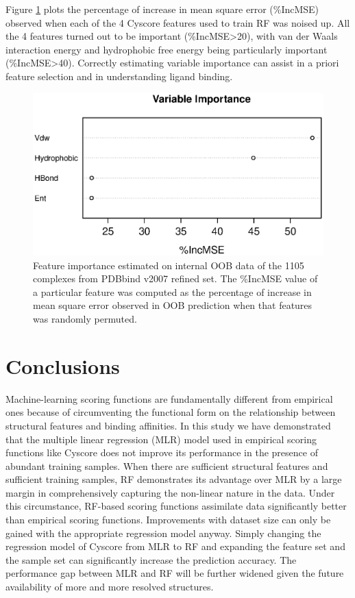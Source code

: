\documentclass[journal=jacsat,manuscript=article]{achemso}
\begin{document}
Figure \ref{fig:varimp} plots the percentage of increase in mean square error (\%IncMSE) observed when each of the 4 Cyscore features used to train RF was noised up. All the 4 features turned out to be important (\%IncMSE\textgreater 20), with van der Waals interaction energy and hydrophobic free energy being particularly important (\%IncMSE\textgreater 40). Correctly estimating variable importance can assist in a priori feature selection and in understanding ligand binding.

\begin{figure}
\includegraphics[width=\linewidth]{../rfcyscore/x4/rf/trn-1105.eps}
\caption{Feature importance estimated on internal OOB data of the 1105 complexes from PDBbind v2007 refined set. The \%IncMSE value of a particular feature was computed as the percentage of increase in mean square error observed in OOB prediction when that features was randomly permuted.}
\label{fig:varimp}
\end{figure}

\section{Conclusions}

Machine-learning scoring functions are fundamentally different from empirical ones because of circumventing the functional form on the relationship between structural features and binding affinities. In this study we have demonstrated that the multiple linear regression (MLR) model used in empirical scoring functions like Cyscore does not improve its performance in the presence of abundant training samples. When there are sufficient structural features and sufficient training samples, RF demonstrates its advantage over MLR by a large margin in comprehensively capturing the non-linear nature in the data. Under this circumstance, RF-based scoring functions assimilate data significantly better than empirical scoring functions. Improvements with dataset size can only be gained with the appropriate regression model anyway. Simply changing the regression model of Cyscore from MLR to RF and expanding the feature set and the sample set can significantly increase the prediction accuracy. The performance gap between MLR and RF will be further widened given the future availability of more and more resolved structures.
\end{document}
